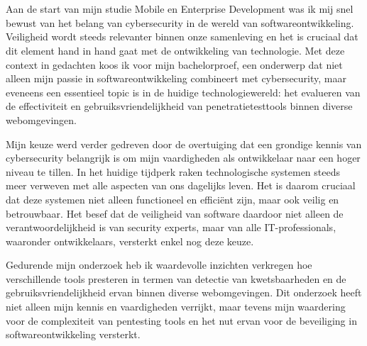 
\chapter*{}%
\label{ch:voorwoord}


Aan de start van mijn studie Mobile en Enterprise Development was ik mij snel bewust van het belang van cybersecurity in de wereld van softwareontwikkeling. 
Veiligheid wordt steeds relevanter binnen onze samenleving en het is cruciaal dat dit element hand in hand gaat met de ontwikkeling van technologie. 
Met deze context in gedachten koos ik voor mijn bachelorproef, een onderwerp dat niet alleen mijn passie in softwareontwikkeling combineert met cybersecurity, 
maar eveneens een essentieel topic is in de huidige technologiewereld: het evalueren van de effectiviteit en gebruiksvriendelijkheid van 
penetratietesttools binnen diverse webomgevingen.

Mijn keuze werd verder gedreven door de overtuiging dat een grondige kennis van cybersecurity belangrijk is om mijn vaardigheden als ontwikkelaar naar een hoger niveau te tillen. In het huidige 
tijdperk raken technologische systemen steeds meer verweven met alle aspecten van ons dagelijks leven. Het is daarom cruciaal dat deze systemen niet alleen 
functioneel en efficiënt zijn, maar ook veilig en betrouwbaar. Het besef dat de veiligheid van software daardoor niet alleen de verantwoordelijkheid 
is van security experts, maar van alle IT-professionals, waaronder ontwikkelaars, versterkt enkel nog deze keuze.

Gedurende mijn onderzoek heb ik waardevolle inzichten verkregen hoe verschillende tools presteren in termen van detectie van kwetsbaarheden en de 
gebruiksvriendelijkheid ervan binnen diverse webomgevingen. Dit onderzoek heeft niet alleen mijn kennis en vaardigheden 
verrijkt, maar tevens mijn waardering voor de complexiteit van pentesting tools en het nut ervan voor de beveiliging in softwareontwikkeling versterkt.

